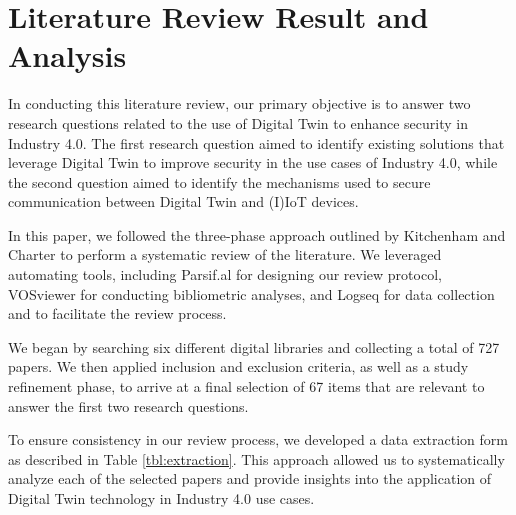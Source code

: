 \section{Literature Review Result and Analysis}
In conducting this literature review, our primary objective is to answer two research questions related to the use of Digital Twin to enhance security in Industry 4.0. The first research question aimed to identify existing solutions that leverage Digital Twin to improve security in the use cases of Industry 4.0, while the second question aimed to identify the mechanisms used to secure communication between Digital Twin and (I)IoT devices.

In this paper, we followed the three-phase approach outlined by Kitchenham and Charter \cite{kitchenham_guidelines_2007} to perform a systematic review of the literature. We leveraged automating tools, including Parsif.al for designing our review protocol, VOSviewer for conducting bibliometric analyses, and Logseq for data collection and to facilitate the review process.

We began by searching six different digital libraries and collecting a total of 727 papers. We then applied inclusion and exclusion criteria, as well as a study refinement phase, to arrive at a final selection of 67 items that are relevant to answer the first two research questions.


To ensure consistency in our review process, we developed a data extraction form as described in Table \ref{tbl:extraction}. This approach allowed us to systematically analyze each of the selected papers and provide insights into the application of Digital Twin technology in Industry 4.0 use cases.





